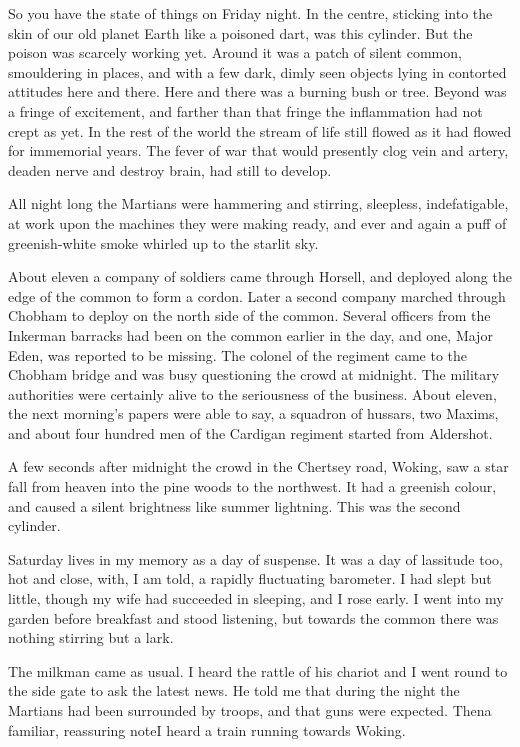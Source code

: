 So you have the state of things on Friday night. In the centre,
sticking into the skin of our old planet Earth like a poisoned
dart, was this cylinder. But the poison was scarcely working yet.
Around it was a patch of silent common, smouldering in places, and
with a few dark, dimly seen objects lying in contorted attitudes
here and there. Here and there was a burning bush or tree. Beyond
was a fringe of excitement, and farther than that fringe the
inflammation had not crept as yet. In the rest of the world the
stream of life still flowed as it had flowed for immemorial years.
The fever of war that would presently clog vein and artery, deaden
nerve and destroy brain, had still to develop.

All night long the Martians were hammering and stirring, sleepless,
indefatigable, at work upon the machines they were making ready,
and ever and again a puff of greenish-white smoke whirled up to the
starlit sky.

About eleven a company of soldiers came through Horsell, and
deployed along the edge of the common to form a cordon. Later a
second company marched through Chobham to deploy on the north side
of the common. Several officers from the Inkerman barracks had been
on the common earlier in the day, and one, Major Eden, was reported
to be missing. The colonel of the regiment came to the Chobham
bridge and was busy questioning the crowd at midnight. The military
authorities were certainly alive to the seriousness of the
business. About eleven, the next morning's papers were able to say,
a squadron of hussars, two Maxims, and about four hundred men of
the Cardigan regiment started from Aldershot.

A few seconds after midnight the crowd in the Chertsey road,
Woking, saw a star fall from heaven into the pine woods to the
northwest. It had a greenish colour, and caused a silent brightness
like summer lightning. This was the second cylinder.

Saturday lives in my memory as a day of suspense. It was a day of
lassitude too, hot and close, with, I am told, a rapidly
fluctuating barometer. I had slept but little, though my wife had
succeeded in sleeping, and I rose early. I went into my garden
before breakfast and stood listening, but towards the common there
was nothing stirring but a lark.

The milkman came as usual. I heard the rattle of his chariot and I
went round to the side gate to ask the latest news. He told me that
during the night the Martians had been surrounded by troops, and
that guns were expected. Then\dash{}a familiar, reassuring note\dash{}I heard
a train running towards Woking.

